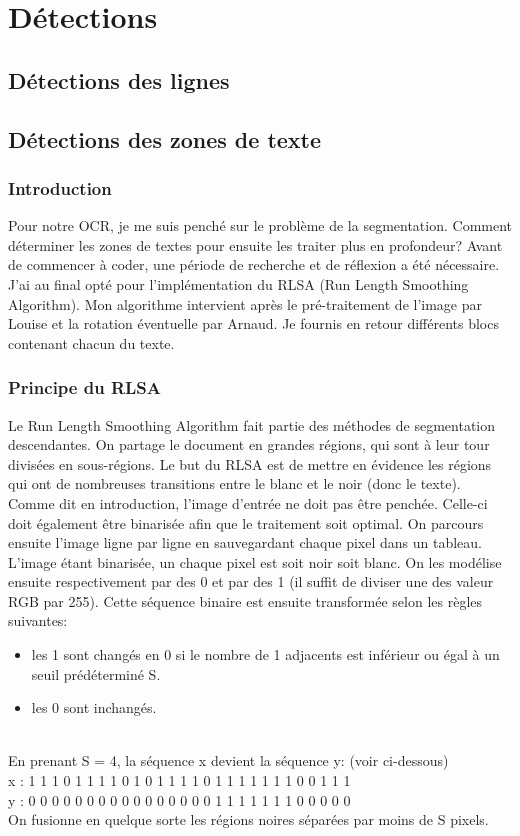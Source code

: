 \documentclass [french,12pt]{article}
\begin{document}
\section{Détections}
\subsection{Détections des lignes}
\subsection{Détections des zones de texte}
\subsubsection{Introduction}


Pour notre OCR, je me suis penché sur le problème de la segmentation.
Comment déterminer les zones de textes pour ensuite les traiter plus en profondeur?
Avant de commencer à coder, une période de recherche et de réflexion a été nécessaire.
J'ai au final opté pour l'implémentation du RLSA (Run Length Smoothing Algorithm). 
Mon algorithme intervient après le pré-traitement de l'image par Louise et la rotation éventuelle par Arnaud.
Je fournis en retour différents blocs contenant chacun du texte. 

\subsubsection{Principe du RLSA}

Le Run Length Smoothing Algorithm fait partie des méthodes de segmentation descendantes. On partage le document en grandes régions, qui sont à leur tour divisées en sous-régions. 
Le but du RLSA est de mettre en évidence les régions qui ont de nombreuses transitions entre le blanc et le noir (donc le texte).
\\
Comme dit en introduction, l'image d'entrée ne doit pas être penchée. Celle-ci doit également être binarisée afin que le traitement soit optimal. 
On parcours ensuite l'image ligne par ligne en sauvegardant chaque pixel dans un tableau. L'image étant binarisée, un chaque pixel est soit noir soit blanc.
On les modélise ensuite respectivement par des 0 et par des 1 (il suffit de diviser une des valeur RGB par 255).
Cette séquence binaire est ensuite transformée selon les règles suivantes:
\begin{itemize}
\item les 1 sont changés en 0 si le nombre de 1 adjacents est inférieur ou égal à un seuil prédéterminé S.
\item les 0 sont inchangés.
\\
\end{itemize}
\\
En prenant S = 4, la séquence x devient la séquence y: (voir ci-dessous) \\
x : 1 1 1 0 1 1 1 1 0 1 0 1 1 1 1 0 1 1 1 1 1 1 1 0 0 1 1 1 \\
y : 0 0 0 0 0 0 0 0 0 0 0 0 0 0 0 0 1 1 1 1 1 1 1 0 0 0 0 0 \\
On fusionne en quelque sorte les régions noires séparées par moins de S pixels.
\\
\end{document}
